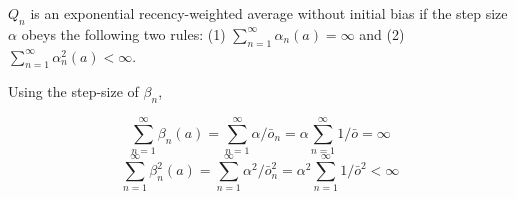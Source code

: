 \documentclass[11pt]{article}
\begin{document}
\begin{enumerate}
		$Q_n$ is an exponential recency-weighted average without initial bias if the step size $\alpha$ obeys the following two rules: (1) $\sum_{n=1}^\infty\alpha_n(a)=\infty$
		and (2) $\sum_{n=1}^\infty \alpha^2_n(a)<\infty$.
		
		Using the step-size of $\beta_n$,
		
		$$\sum_{n=1}^\infty\beta_n(a)=\sum_{n=1}^\infty\alpha/\bar{o}_n=\alpha\sum_{n=1}^\infty1/\bar{o}=\infty$$
		$$\sum_{n=1}^\infty\beta^2_n(a)=\sum_{n=1}^\infty\alpha^2/\bar{o}^2_n=\alpha^2 \sum_{n=1}^\infty 1/\bar{o}^2<\infty$$
		
	\end{enumerate}
	
\end{document}
